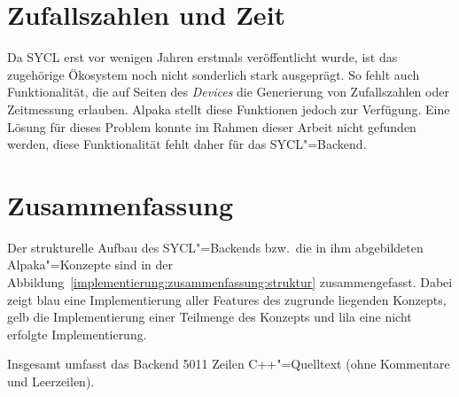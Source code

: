 \section{Zufallszahlen und Zeit}

Da SYCL erst vor wenigen Jahren erstmals veröffentlicht wurde, ist das
zugehörige Ökosystem noch nicht sonderlich stark ausgeprägt. So fehlt auch
Funktionalität, die auf Seiten des \textit{Devices} die Generierung von
Zufallszahlen oder Zeitmessung erlauben. Alpaka stellt diese Funktionen jedoch
zur Verfügung. Eine Lösung für dieses Problem konnte im Rahmen dieser Arbeit
nicht gefunden werden, diese Funktionalität fehlt daher für das SYCL"=Backend.

\section{Zusammenfassung}

Der strukturelle Aufbau des SYCL"=Backends bzw.\ die in ihm abgebildeten
Alpaka"=Konzepte sind in der
Abbildung~\ref{implementierung:zusammenfassung:struktur} zusammengefasst. Dabei
zeigt blau eine Implementierung aller Features des zugrunde liegenden Konzepts,
gelb die Implementierung einer Teilmenge des Konzepts und lila eine
nicht erfolgte Implementierung.

Insgesamt umfasst das Backend \num{5011} Zeilen C++"=Quelltext (ohne Kommentare
und Leerzeilen).


